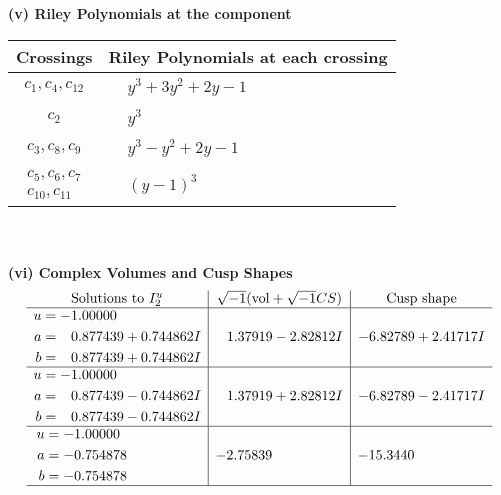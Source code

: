 \documentclass[1p]{elsarticle_modified}
\theoremstyle{definition}
\newcommand{\I}{\sqrt{-1}}
\begin{document}
\flushleft \textbf{(v) Riley Polynomials at the component}\newline \\
\begin{tabular}{m{50pt}|m{274pt}}
Crossings & \hspace{64pt}Riley Polynomials at each crossing \\
\hline $$\begin{aligned}c_{1},c_{4},c_{12}\end{aligned}$$&$\begin{aligned}
&y^3+3 y^2+2 y-1
\end{aligned}$\\
\hline $$\begin{aligned}c_{2}\end{aligned}$$&$\begin{aligned}
&y^3
\end{aligned}$\\
\hline $$\begin{aligned}c_{3},c_{8},c_{9}\end{aligned}$$&$\begin{aligned}
&y^3- y^2+2 y-1
\end{aligned}$\\
\hline $$\begin{aligned}c_{5},c_{6},c_{7}\\c_{10},c_{11}\end{aligned}$$&$\begin{aligned}
&(y-1)^3
\end{aligned}$\\
\hline
\end{tabular}\\~\\
\newpage\flushleft \textbf{(vi) Complex Volumes and Cusp Shapes}
$$\begin{array}{c|c|c}  
\text{Solutions to }I^u_{2}& \I (\text{vol} + \sqrt{-1}CS) & \text{Cusp shape}\\
 \hline 
\begin{aligned}
u &= -1.00000\phantom{ +0.000000I} \\
a &= \phantom{-}0.877439 + 0.744862 I \\
b &= \phantom{-}0.877439 + 0.744862 I\end{aligned}
 & \phantom{-}1.37919 - 2.82812 I & -6.82789 + 2.41717 I \\ \hline\begin{aligned}
u &= -1.00000\phantom{ +0.000000I} \\
a &= \phantom{-}0.877439 - 0.744862 I \\
b &= \phantom{-}0.877439 - 0.744862 I\end{aligned}
 & \phantom{-}1.37919 + 2.82812 I & -6.82789 - 2.41717 I \\ \hline\begin{aligned}
u &= -1.00000\phantom{ +0.000000I} \\
a &= -0.754878\phantom{ +0.000000I} \\
b &= -0.754878\phantom{ +0.000000I}\end{aligned}
 & -2.75839\phantom{ +0.000000I} & -15.3440\phantom{ +0.000000I}\\
 \hline 
 \end{array}$$\newpage
\end{document}
